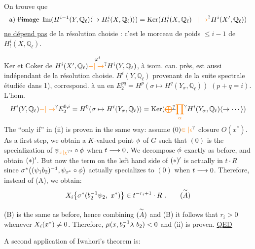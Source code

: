 On trouve que
\[
\text{a) }\deleted{\text{l'image}}\ \operatorname{Im}(H^{i-1}(Y,\mathbb{Q}_\ell)\inserted{\to H^i_!(X,\mathbb{Q}_\ell)})=\operatorname{Ker}(H^i_!(X,\mathbb{Q}_\ell)\unsure{-|\to}H^i(X',\mathbb{Q}_\ell))
\]
\uline{ne dépend pas} de la résolution choisie : c'est le morceau de poids $\leq i-1$ de $H^i_!(X,\mathbb{Q}_\ell)$.


 Ker et Coker de $H^i(X',\mathbb{Q}_\ell)\overset{\varphi^i}{\unsure{-|\to}}H^i(Y,\mathbb{Q}_\ell)$, à isom. can. près, est aussi indépendant de la résolution choisie.   $H^i(Y,\mathbb{Q}_\ell)$ provenant de la suite spectrale étudiée dans 1), correspond. à un  en $E_2^{pq}=H^p(\sigma\mapsto H^q(Y_\sigma,\mathbb{Q}_\ell))$ $(p+q=i)$. L'hom.
\[
H^i(Y,\mathbb{Q}_\ell)\unsure{-|\to}E_2^{0,i}=H^0(\sigma\mapsto H^i(Y_\sigma,\mathbb{Q}_\ell))=\operatorname{Ker}(\deleted{\unsure{\bigoplus}}\unsure{\prod_\alpha}H^i(Y_\alpha,\mathbb{Q}_\ell)\inserted{\to\cdots})
\]
The ``only if'' in (ii) is proven in the same way: assume $(0)\handwritten{\unsure{\in|\epsilon}}$ closure $O(x^*)$. As a first step, we obtain a $K$-valued point $\phi$ of $G$ such that $(0)$ is the specialization of $\handwritten{\psi_{{\unsure{x|\chi}}^*}\circ\phi}$ when $t\longrightarrow0$. We decompose $\phi$ exactly as before, and obtain $(*)'$. But now the term on the left hand side of $(*)'$ is actually in $t\cdot R$ since $\sigma^{*}\bigl((\psi_1 b_2)^{-1},\psi_{x^*}\circ\phi\bigr)$ actually specializes to $(0)$ when $t\longrightarrow0$. Therefore, instead of (A), we obtain:
\[
X_i\handwritten{\bigl\{}\handwritten{\sigma}^{*}(b_2^{-1}\handwritten{\psi}_2,\ x^*)\handwritten{\bigr\}}\handwritten{\in}t^{-r_{\handwritten{i}}+1}\cdot R\ .
\tag*{($\overset{\handwritten{\sim}}{A}$)}
\]

(B) is the same as before, hence combining $(\overset{\sim}{A})$ and (B) it follows that $r_i>0$ whenever $X_i(x^*)\neq0$. Therefore, $\handwritten{\mu}(x,b_2^{-1}\handwritten{\lambda}\ b_2)<0$ and (ii) is proven. \uline{QED}

A second application of Iwahori's theorem is:

